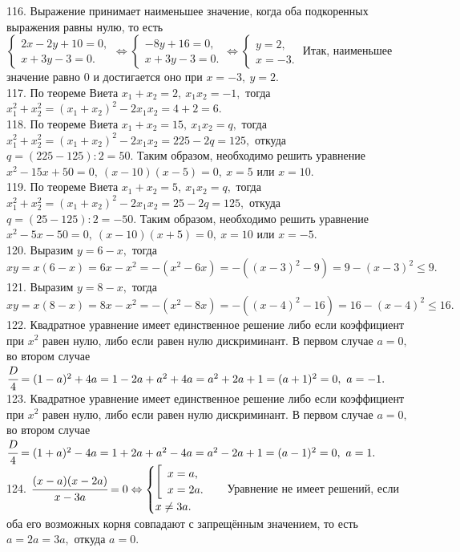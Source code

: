 \documentclass[12pt]{article}
\begin{document}
116. Выражение принимает наименьшее значение, когда оба подкоренных выражения равны нулю, то есть $\begin{cases} 2x-2y+10=0,\\ x+3y-3=0.\end{cases}
\Leftrightarrow \begin{cases} -8y+16=0,\\ x+3y-3=0.\end{cases}\Leftrightarrow \begin{cases} y=2,\\ x=-3.\end{cases}$ Итак, наименьшее значение равно 0 и достигается оно при $x=-3,\ y=2.$\\
117. По теореме Виета $x_1+x_2=2,\ x_1x_2=-1,$ тогда $x_1^2+x_2^2=(x_1+x_2)^2-2x_1x_2=4+2=6.$\\
118. По теореме Виета $x_1+x_2=15,\ x_1x_2=q,$ тогда $x_1^2+x_2^2=(x_1+x_2)^2-2x_1x_2=225-2q=125,$ откуда $q=(225-125):2=50.$ Таким образом, необходимо решить уравнение $x^2-15x+50=0,\ (x-10)(x-5)=0,\ x=5$ или $x=10.$\\
119. По теореме Виета $x_1+x_2=5,\ x_1x_2=q,$ тогда $x_1^2+x_2^2=(x_1+x_2)^2-2x_1x_2=25-2q=125,$ откуда $q=(25-125):2=-50.$ Таким образом, необходимо решить уравнение $x^2-5x-50=0,\ (x-10)(x+5)=0,\ x=10$ или $x=-5.$\\
120. Выразим $y=6-x,$ тогда $xy=x(6-x)=6x-x^2=-(x^2-6x)=-((x-3)^2-9)=9-(x-3)^2\leqslant 9.$\\
121. Выразим $y=8-x,$ тогда $xy=x(8-x)=8x-x^2=-(x^2-8x)=-((x-4)^2-16)=16-(x-4)^2\leqslant 16.$\\
122. Квадратное уравнение имеет единственное решение либо если коэффициент при $x^2$ равен нулю, либо если равен нулю дискриминант. В первом случае $a=0,$ во втором случае $\cfrac{D}{4}=(1-a)^2+4a=1-2a+a^2+4a=a^2+2a+1=(a+1)^2=0,\ a=-1.$\\
123. Квадратное уравнение имеет единственное решение либо если коэффициент при $x^2$ равен нулю, либо если равен нулю дискриминант. В первом случае $a=0,$ во втором случае $\cfrac{D}{4}=(1+a)^2-4a=1+2a+a^2-4a=a^2-2a+1=(a-1)^2=0,\ a=1.$\\
124. $\cfrac{(x-a)(x-2a)}{x-3a}=0\Leftrightarrow \begin{cases} \left[\begin{array}{l} x=a,\\ x=2a.\end{array}\right.\\ x\neq 3a.\end{cases}$ Уравнение не имеет решений, если оба его возможных корня совпадают с запрещённым значением, то есть $a=2a=3a,$ откуда $a=0.$\\
\end{document}
